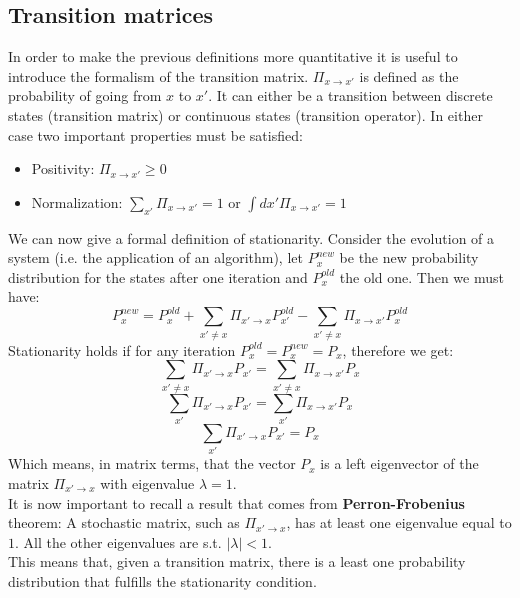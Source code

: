 \subsection{Transition matrices}
In order to make the previous definitions more quantitative it is useful to introduce the formalism of the transition matrix.
$\Pi_{x \rightarrow x'}$ is defined as the probability of going from $x$ to $x'$. It can either be a transition between discrete states (transition matrix) or continuous states (transition operator). In either case two important properties must be satisfied:
\begin{itemize}
\item Positivity: $\Pi_{x \rightarrow x'} \geq 0$
\item Normalization: $\sum_{x'}\Pi_{x \rightarrow x'}=1$ or $\int d x'\Pi_{x \rightarrow x'}=1$
\end{itemize}
We can now give a formal definition of stationarity. Consider the evolution of a system (i.e. the application of an algorithm), let $P_{x}^{new}$ be the new probability distribution for the states after one iteration and $P_{x}^{old}$ the old one. Then we must have:
\begin{equation*}
    P_{x}^{new}  = P_{x}^{old} + \sum_{x' \neq x}\Pi_{x' \rightarrow x}P_{x'}^{old} - \sum_{x' \neq x}\Pi_{x \rightarrow x'}P_{x}^{old} 
\end{equation*}
Stationarity holds if for any iteration $P_{x}^{old}  = P_{x}^{new} = P_{x}$, therefore we get:
\begin{equation*}
    \sum_{x' \neq x}\Pi_{x' \rightarrow x}P_{x'} = \sum_{x' \neq x}\Pi_{x \rightarrow x'}P_{x}
\end{equation*}
\begin{equation*}
    \sum_{x'}\Pi_{x' \rightarrow x}P_{x'} = \sum_{x'}\Pi_{x \rightarrow x'}P_{x}
\end{equation*}
\begin{equation*}
    \sum_{x'}\Pi_{x' \rightarrow x}P_{x'} = P_{x} 
\end{equation*}
Which means, in matrix terms, that the vector $P_x$ is a left eigenvector of the matrix $\Pi_{x'\rightarrow x}$ with eigenvalue $\lambda = 1$.
\smallskip
\\
It is now important to recall a result that comes from \textbf{Perron-Frobenius} theorem: A stochastic matrix, such as $\Pi_{x'\rightarrow x}$, has at least one eigenvalue equal to $1$. All the other eigenvalues are s.t. $|\lambda|<1$.\\
This means that, given a transition matrix, there is a least one probability distribution that fulfills the stationarity condition.

